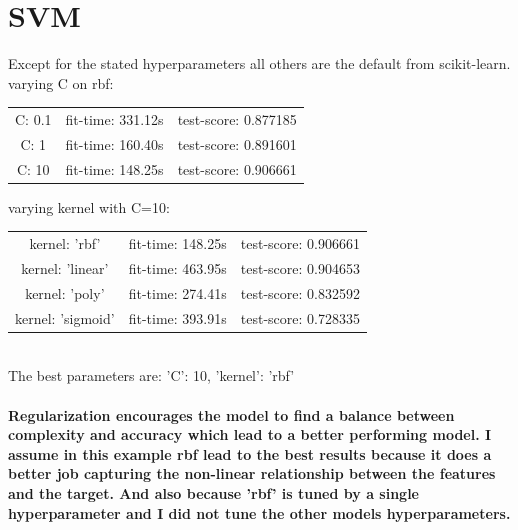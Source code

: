 \documentclass{article}
\begin{document}
\section{SVM}
Except for the stated hyperparameters all others are the default from scikit-learn.
varying C on rbf: \\ 
\begin{tabular}{|c c c|}
C: 0.1 & fit-time: 331.12s & test-score: 0.877185 \\
C: 1 & fit-time: 160.40s & test-score: 0.891601 \\
C: 10 & fit-time: 148.25s & test-score: 0.906661 \\
\end{tabular}

varying kernel with C=10: \\ 
\begin{tabular}{|c c c|}
kernel: 'rbf' & fit-time: 148.25s & test-score: 0.906661 \\
kernel: 'linear' & fit-time: 463.95s & test-score: 0.904653 \\
kernel: 'poly' & fit-time: 274.41s & test-score: 0.832592 \\
kernel: 'sigmoid' & fit-time: 393.91s & test-score: 0.728335 \\
\end{tabular}
\\ 
The best parameters are: 'C': 10, 'kernel': 'rbf'

\paragraph[Comment]{
Regularization encourages the model to find a balance between complexity and accuracy which lead to a better performing model.
I assume in this example rbf lead to the best results because it does a better job capturing the non-linear relationship between the features and the target.
And also because 'rbf' is tuned by a single hyperparameter and I did not tune the other models hyperparameters.
}

\end{document}
